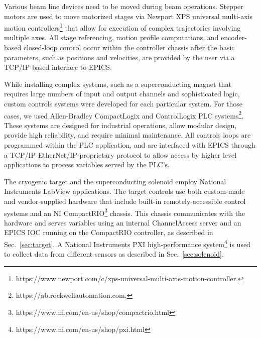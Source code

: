 Various beam line devices need to be moved during beam operations. Stepper motors are used to move motorized stages via Newport XPS universal multi-axis motion controllers\footnote{https://www.newport.com/c/xps-universal-multi-axis-motion-controller.} that allow for execution of complex trajectories involving multiple axes. All stage referencing, motion profile computations, and encoder-based closed-loop control occur within the controller chassis after the basic parameters, such as positions and velocities, are provided by the user via a TCP/IP-based interface to EPICS.   

While installing complex systems, such as a superconducting magnet that requires large numbers of input and output channels and sophisticated logic, custom controls systems were developed for each particular system. For those cases, we used Allen-Bradley CompactLogix and ControlLogix PLC systems\footnote{https://ab.rockwellautomation.com.}. These systems are designed for industrial operations, allow modular design, provide high reliability, and require minimal maintenance. All controls loops are programmed within the PLC application, and are interfaced with EPICS through a TCP/IP-EtherNet/IP-proprietary protocol to allow access by higher level applications to process variables served by the PLC's.  

The cryogenic target and the superconducting solenoid employ National Instruments LabView applications. The target controls use both custom-made and vendor-supplied hardware that include built-in remotely-accessible control systems and an NI CompactRIO\footnote{https://www.ni.com/en-us/shop/compactrio.html} chassis. This chassis communicates with the hardware and serves variables using an internal ChannelAccess server and an EPICS IOC running on the CompactRIO controller, as described in Sec.~\ref{sec:target}. A National Instruments PXI high-performance system\footnote{https://www.ni.com/en-us/shop/pxi.html} is used to collect data from different sensors as described in Sec.~\ref{sec:solenoid}. 

